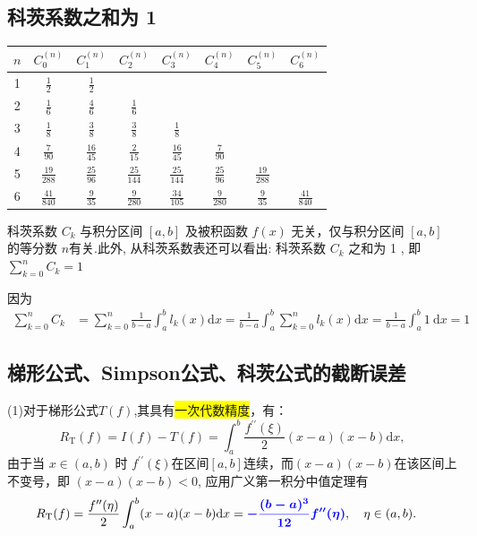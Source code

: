 \subsection{科茨系数之和为 1 }
\begin{center}
\begin{tabular}{c|ccccccc}
\hline$ n $ & $ C_{0}^{(n)} $ & $ C_{1}^{(n)} $ & $ C_{2}^{(n)} $ & $ C_{3}^{(n)} $ & $ C_{4}^{(n)} $ & $ C_{5}^{(n)} $ & $ C_{6}^{(n)} $ \\
\hline 1 & $ \frac{1}{2} $ & $ \frac{1}{2} $ & & & & \\
\hline 2 & $ \frac{1}{6} $ & $ \frac{4}{6} $ & $ \frac{1}{6} $ & & & \\
\hline 3 & $ \frac{1}{8} $ & $ \frac{3}{8} $ & $ \frac{3}{8} $ & $ \frac{1}{8} $ & & & \\
\hline 4 & $ \frac{7}{90} $ & $ \frac{16}{45} $ & $ \frac{2}{15} $ & $ \frac{16}{45} $ & $ \frac{7}{90} $ & \\
\hline 5 & $ \frac{19}{288} $ & $ \frac{25}{96} $ & $ \frac{25}{144} $ & $ \frac{25}{144} $ & $ \frac{25}{96} $ & $ \frac{19}{288} $ & \\
\hline 6 & $ \frac{41}{840} $ & $ \frac{9}{35} $ & $ \frac{9}{280} $ & $ \frac{34}{105} $ & $ \frac{9}{280} $ & $ \frac{9}{35} $ & $ \frac{41}{840} $ \\
\hline
\end{tabular}
\end{center}

科茨系数 $ C_{k} $ 与积分区间 $ [a, b] $ 及被积函数 $ f(x) $ 无关，仅与积分区间 $ [a, b] $ 的等分数 $ n $有关.此外, 从科茨系数表还可以看出: 科茨系数 $ C_{k} $ 之和为 1 , 即$\sum\limits_{k=0}^{n} C_{k}=1$

因为
$$
\begin{aligned}
\sum_{k=0}^{n} C_{k} & =\sum_{k=0}^{n} \frac{1}{b-a} \int_{a}^{b} l_{k}(x) \mathrm{d} x  =\frac{1}{b-a} \int_{a}^{b} \sum_{k=0}^{n} l_{k}(x) \mathrm{d} x=\frac{1}{b-a} \int_{a}^{b} 1 \mathrm{~d} x=1
\end{aligned}
$$






\newpage
\subsection{梯形公式、Simpson公式、科茨公式的截断误差}

(1)对于梯形公式$T(f)$,其具有\colorbox{yellow}{一次代数精度}，有：
$$
R_{\mathrm{T}}(f)=I(f)-T(f)=\int_{a}^{b} \frac{f^{\prime \prime}(\xi)}{2}(x-a)(x-b) \mathrm{d} x,
$$
由于当 $ x \in(a, b) $ 时 $f^{\prime \prime}(\xi)$在区间$[a,b]$连续，而$(x-a)(x-b)$在该区间上不变号，即 $(x-a)(x-b)<0 $, 应用广义第一积分中值定理有
$$
\begin{aligned}
R_{\mathrm{T}}(f) & =\frac{f^{\prime \prime}(\eta)}{2} \int_{a}^{b}(x-a)(x-b) \mathrm{d} x  =\textcolor{blue}{\bm{-\frac{(b-a)^{3}}{12} f^{\prime \prime}(\eta)}}, \quad \eta \in(a, b) .
\end{aligned}
$$

